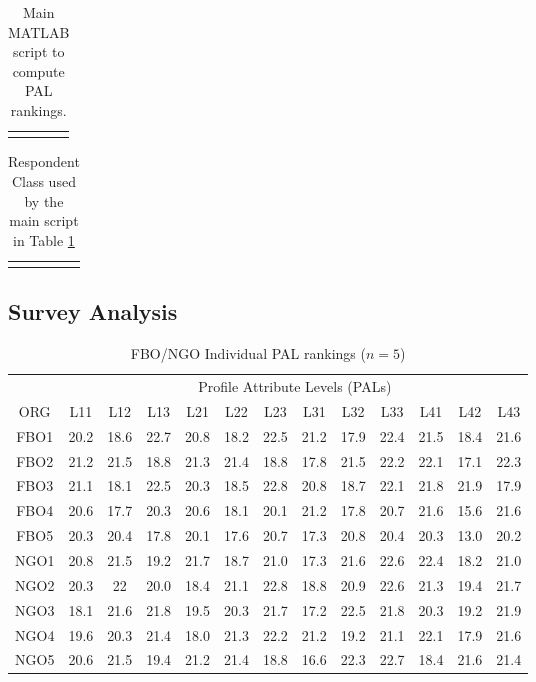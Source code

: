 \documentclass[a4paper, 12pt]{article}
\begin{document}
\begin{table}[!htbp]
	\flushleft
	\begin{tabular}{|l|}\toprule
		\parbox[b]{6.25in}{}\\\bottomrule
	\end{tabular}
\caption{Main MATLAB script to compute PAL rankings.}
	\label{MAT1}
\end{table}

\begin{table}[!htpb]
	\flushleft
	\begin{tabular}{|l|}\toprule
		\parbox[b]{6.25in}{}\\\bottomrule
	\end{tabular}
	\caption{Respondent Class used by the main script in Table \ref{MAT1}}
		\label{MAT12}
	\end{table}





\newpage


\subsection{Survey Analysis}
\begin{table}[!htpb]
	\centering
	\scriptsize
	\begin{tabular}{c|ccc|ccc|ccc|ccc}
		&\multicolumn{12}{c}{Profile Attribute Levels (PALs)}\\
		ORG & L11&L12&L13&L21&L22&L23&L31&L32&L33&L41&L42&L43\\\hline
FBO1 &20.2&18.6&22.7&20.8&18.2&22.5&  21.2&17.9&22.4&21.5&18.4&21.6\\
FBO2 &21.2&21.5&18.8&21.3&21.4&18.8&  17.8&21.5&22.2&22.1&17.1&22.3\\
FBO3 &21.1&18.1&22.5&20.3&18.5&22.8&   20.8&18.7&22.1&21.8&21.9&17.9\\
FBO4 &20.6&17.7&20.3&20.6&18.1&20.1&  21.2&17.8&20.7&21.6&15.6&21.6\\
FBO5 &20.3&20.4&17.8&20.1&17.6&20.7&  17.3&20.8&20.4&20.3&13.0&20.2\\\hline
NGO1 &20.8&21.5&19.2&21.7& 18.7&21.0&   17.3&21.6&22.6&22.4&18.2&21.0\\
NGO2 &20.3&22  &20.0&18.4& 21.1&22.8&   18.8&20.9&22.6&21.3&19.4&21.7\\
NGO3 &18.1&21.6&21.8&19.5& 20.3&21.7&   17.2&22.5&21.8&20.3&19.2&21.9\\
NGO4 &19.6&20.3&21.4&18.0& 21.3&22.2&   21.2&19.2&21.1&22.1&17.9&21.6\\
NGO5 &20.6&21.5&19.4&21.2&21.4&18.8&   16.6&22.3&22.7&18.4&21.6&21.4\\\hline
	\end{tabular}
\caption{FBO/NGO Individual PAL rankings ($n=5$)}
\label{PAL}
\end{table}
\end{document}
